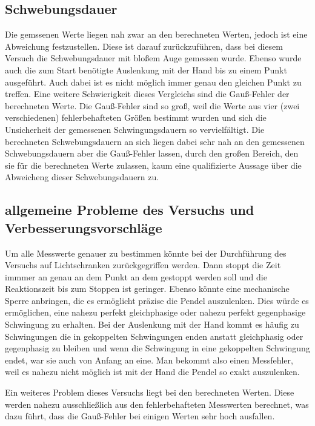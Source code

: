 \documentclass[titlepage=firstcover, captions=tableheading]{scrartcl}
\begin{document}
\subsection{Schwebungsdauer}

Die gemssenen Werte liegen nah zwar an den berechneten Werten, jedoch ist eine Abweichung festzustellen.
Diese ist darauf zurückzuführen, dass bei diesem Versuch die Schwebungsdauer mit bloßem Auge gemessen wurde.
Ebenso wurde auch die zum Start benötigte Auslenkung mit der Hand bis zu einem Punkt ausgeführt.
Auch dabei ist es nicht möglich immer genau den gleichen Punkt zu treffen.
Eine weitere Schwierigkeit dieses Vergleichs sind die Gauß-Fehler der berechneten Werte.
Die Gauß-Fehler sind so groß, weil die Werte aus vier (zwei verschiedenen) fehlerbehafteten Größen bestimmt wurden 
und sich die Unsicherheit der gemessenen Schwingungsdauern so vervielfältigt.
Die berechneten Schwebungsdauern an sich liegen dabei sehr nah an den gemessenen Schwebungsdauern aber die Gauß-Fehler lassen,
durch den großen Bereich, den sie für die berechneten Werte zulassen,
kaum eine qualifizierte Aussage über die Abweicheng dieser Schwebungsdauern zu.

\subsection{allgemeine Probleme des Versuchs und Verbesserungsvorschläge}

Um alle Messwerte genauer zu bestimmen könnte bei der Durchführung des Versuchs auf Lichtschranken zurückgegriffen werden. 
Dann stoppt die Zeit immmer an genau an dem Punkt an dem gestoppt werden soll und die Reaktionszeit bis zum Stoppen ist geringer.
Ebenso könnte eine mechanische Sperre anbringen, die es ermöglicht präzise die Pendel auszulenken. 
Dies würde es ermöglichen, eine nahezu perfekt gleichphasige oder nahezu perfekt gegenphasige Schwingung zu erhalten. 
Bei der Auslenkung mit der Hand kommt es häufig zu Schwingungen die in gekoppelten Schwingungen enden anstatt gleichphasig oder gegenphasig zu bleiben 
und wenn die Schwingung in eine gekoppelten Schwingung endet, war sie auch von Anfang an eine.
Man bekommt also einen Messfehler, weil es nahezu nicht möglich ist mit der Hand die Pendel so exakt auszulenken.

Ein weiteres Problem dieses Versuchs liegt bei den berechneten Werten. Diese werden nahezu ausschließlich aus den fehlerbehafteten Messwerten berechnet,
was dazu führt, dass die Gauß-Fehler bei einigen Werten sehr hoch ausfallen.
\end{document}
